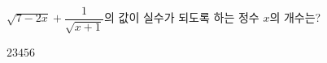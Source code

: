 \hspace*{2mm}\begin{minipage}[t]{\dimexpr\linewidth-2mm\relax}\vspace{0pt}
$\sqrt{7-2x}+\dfrac{1}{\sqrt{x+1}}$의 값이 실수가 되도록 하는 정수 $x$의 개수는?
\begin{choices32}{$2$}{$3$}{$4$}{$5$}{$6$}\end{choices32}\end{minipage}
